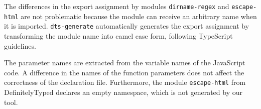 \documentclass[english,cleveref,autoref,submission]{programming}
\begin{document}
The differences in the export assignment by modules \texttt{dirname-regex} and
\texttt{escape-html} are not problematic because the module can receive an arbitrary 
name when it is imported. \texttt{dts-generate} automatically generates the export
assignment by transforming the module name into camel case form, following TypeScript
guidelines.

The parameter names are extracted from the variable names of the JavaScript
code.
A difference in the names of the function parameters does not affect the correctness of
the declaration file.
Furthermore, the module \texttt{escape-html} from DefinitelyTyped declares an empty
namespace, which is not generated by our tool.
 
\end{document}
